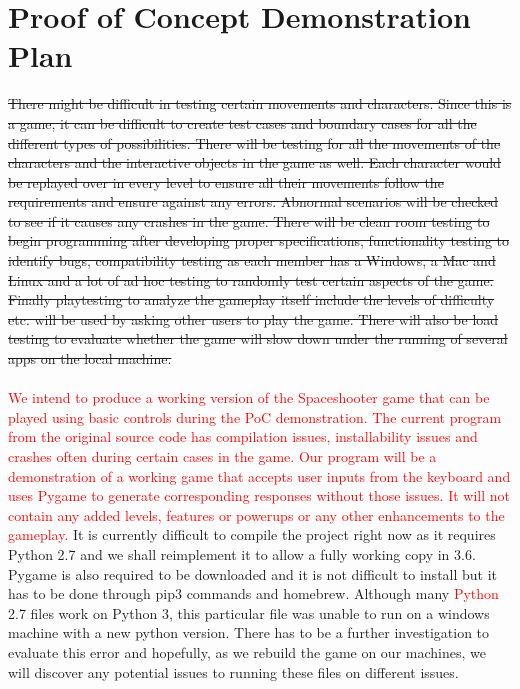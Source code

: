 \documentclass{article}
\begin{document}
\section{Proof of Concept Demonstration Plan}
\smallskip
\sout{There might be difficult in testing certain movements and characters. Since this is a game, it can be difficult to create test cases and boundary cases for all the different types of possibilities. There will be testing for all the movements of the characters and the interactive objects in the game as well. Each character would be replayed over in every level to ensure all their movements follow the requirements and ensure against any errors. Abnormal scenarios will be checked to see if it causes any crashes in the game. There will be clean room testing to begin programming after developing proper specifications, functionality testing to identify bugs, compatibility testing as each member has a Windows, a Mac and Linux and a lot of ad hoc testing to randomly test certain aspects of the game. Finally playtesting to analyze the gameplay itself include the levels of difficulty etc. will be used by asking other users to play the game. There will also be load testing to evaluate whether the game will slow down under the running of several apps on the local machine.} \\
\\ \textcolor{red}{We intend to produce a working version of the Spaceshooter game that can be played using basic controls during the PoC demonstration. The current program from the original source code has compilation issues, installability issues and crashes often during certain cases in the game. Our program will be a demonstration of a working game that accepts user inputs from the keyboard and uses Pygame to generate corresponding responses without those issues.  It will not contain any added levels, features or powerups or any other enhancements to the gameplay.} It is currently difficult to compile the project right now as it requires Python 2.7 and we shall reimplement it to allow a fully working copy in 3.6. Pygame is also required to be downloaded and it is not difficult to install but it has to be done through pip3 commands and homebrew. Although many \textcolor{red}{Python} 2.7 files work on Python 3, this particular file was unable to run on a windows machine with a new python version. There has to be a further investigation to evaluate this error and hopefully, as we rebuild the game on our machines, we will discover any potential issues to running these files on different issues. 
\end{document}

